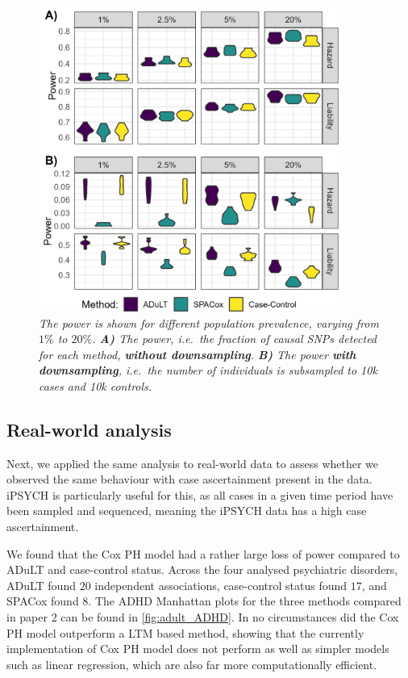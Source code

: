 \begin{figure}[h]
	\centering
	\includegraphics[width=10cm]{results/adult_combined_C250_power}
	\caption[Power simulation results with $ 250 $ causal SNPs under both generative models and varying prevalences.]{\sl The power is shown for different population prevalence, varying from $ 1\% $ to $ 20\% $. \textbf{A)} The power, i.e.\ the fraction of causal SNPs detected for each method, \textbf{without downsampling}. \textbf{B)} The power \textbf{with downsampling}, i.e.\ the number of individuals is subsampled to 10k cases and 10k controls.}
	\label{fig:adult_simulations}
\end{figure}


\subsection{Real-world analysis}
Next, we applied the same analysis to real-world data to assess whether we observed the same behaviour with case ascertainment present in the data. iPSYCH is particularly useful for this, as all cases in a given time period have been sampled and sequenced, meaning the iPSYCH data has a high case ascertainment.

We found that the Cox PH model had a rather large loss of power compared to ADuLT and case-control status. Across the four analysed psychiatric disorders, ADuLT found $ 20 $ independent associations, case-control status found $ 17 $, and SPACox found $ 8 $. The ADHD Manhattan plots for the three methods compared in paper 2 can be found in \cref{fig:adult_ADHD}. In no circumstances did the Cox PH model outperform a LTM based method, showing that the currently implementation of Cox PH model does not perform as well as simpler models such as linear regression, which are also far more computationally efficient.

